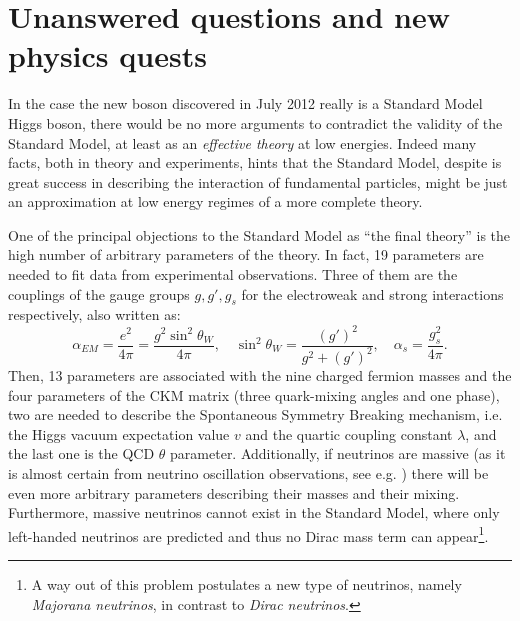 
\section{Unanswered questions and new physics quests}\label{sec:THquest}

In the case the new boson discovered in July 2012 
really is a Standard Model Higgs boson, there would
be no more arguments to contradict the 
validity of the Standard Model, at least 
as an {\it effective theory} at low energies. Indeed many facts, both 
in theory and experiments, hints that the Standard Model,
despite is great success in describing the interaction
of fundamental particles, might be just an approximation
at low energy regimes of a more complete theory.

One of the principal objections to the Standard Model as 
``the final theory'' is the high number of arbitrary parameters 
of the theory. In fact, 19 parameters are needed to fit 
data from experimental observations. 
Three of them  are the couplings of the gauge groups 
$g, g', g_s$ for the electroweak and strong
interactions respectively, also written as: 
\begin{equation}\label{eq:couplings}
\alpha_{EM} = \dfrac{e^{2}}{4\pi} =  \dfrac{g^{2}\sin^{2}\theta_{W}}{4\pi}, 
\quad \sin^{2}\theta_{W} = \dfrac{(g')^{2}}{g^{2}+(g')^{2}}  ,\quad 
\alpha_{s}=\dfrac{g_{s}^{2}}{4\pi}.
\end{equation}
Then, 13 parameters are associated with the nine charged 
fermion masses and the four parameters of the CKM matrix 
(three quark-mixing angles and one phase), 
two are needed to describe the Spontaneous Symmetry Breaking mechanism, 
i.e. the Higgs vacuum expectation value $v$ and 
the quartic coupling constant $\lambda$, and the last one is the 
QCD $\theta$ parameter. Additionally, if neutrinos are massive 
(as it is almost certain from neutrino oscillation observations, 
see e.g. \cite{Langacker:817840}) there will be even more arbitrary 
parameters describing their masses and their mixing. 
Furthermore, massive neutrinos cannot exist in the Standard
Model, where only left-handed neutrinos are predicted and thus
no Dirac mass term can appear\footnote{A way out of this
problem postulates a new type of neutrinos, namely 
{\it Majorana neutrinos}, in contrast to {\it Dirac neutrinos}.}.


